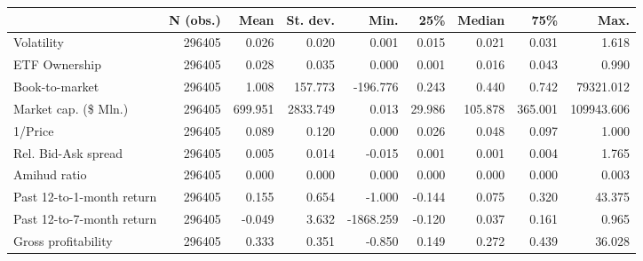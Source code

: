 \begin{tabular}{lrrrrrrrr}
\toprule
{} & N (obs.) &    Mean & St. dev. &      Min. &    25\% &  Median &     75\% &       Max. \\
\midrule
Volatility                &   296405 &   0.026 &    0.020 &     0.001 &  0.015 &   0.021 &   0.031 &      1.618 \\
ETF Ownership             &   296405 &   0.028 &    0.035 &     0.000 &  0.001 &   0.016 &   0.043 &      0.990 \\
Book-to-market            &   296405 &   1.008 &  157.773 &  -196.776 &  0.243 &   0.440 &   0.742 &  79321.012 \\
Market cap. (\$ Mln.)      &   296405 & 699.951 & 2833.749 &     0.013 & 29.986 & 105.878 & 365.001 & 109943.606 \\
1/Price                   &   296405 &   0.089 &    0.120 &     0.000 &  0.026 &   0.048 &   0.097 &      1.000 \\
Rel. Bid-Ask spread       &   296405 &   0.005 &    0.014 &    -0.015 &  0.001 &   0.001 &   0.004 &      1.765 \\
Amihud ratio              &   296405 &   0.000 &    0.000 &     0.000 &  0.000 &   0.000 &   0.000 &      0.003 \\
Past 12-to-1-month return &   296405 &   0.155 &    0.654 &    -1.000 & -0.144 &   0.075 &   0.320 &     43.375 \\
Past 12-to-7-month return &   296405 &  -0.049 &    3.632 & -1868.259 & -0.120 &   0.037 &   0.161 &      0.965 \\
Gross profitability       &   296405 &   0.333 &    0.351 &    -0.850 &  0.149 &   0.272 &   0.439 &     36.028 \\
\bottomrule
\end{tabular}
